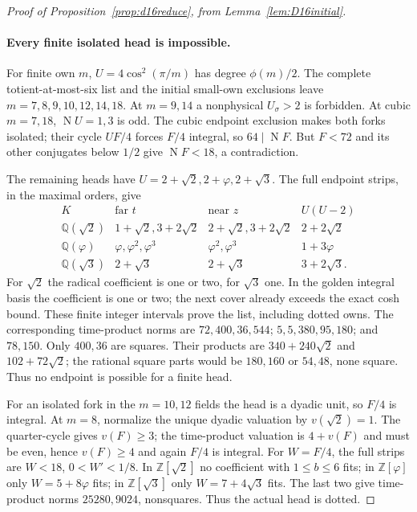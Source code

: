 \documentclass[11pt]{article}
\newcommand{\N}{\operatorname{N}}
\begin{document}
\begin{proof}[Proof of Proposition~\ref{prop:d16reduce}, from
Lemma~\ref{lem:D16initial}]
\paragraph{Every finite isolated head is impossible.}
For finite own $m$, $U=4\cos^2(\pi/m)$ has degree $\phi(m)/2$.
The complete totient-at-most-six list and the initial small-own
exclusions leave $m=7,8,9,10,12,14,18$.
At $m=9,14$ a nonphysical $U_\sigma>2$ is forbidden.
At cubic $m=7,18$, $\N U=1,3$ is odd. The cubic endpoint
exclusion makes both forks isolated; their cycle $UF/4$ forces
$F/4$ integral, so $64\mid\N F$. But $F<72$ and its other
conjugates below $1/2$ give $\N F<18$, a contradiction.

The remaining heads have $U=2+\sqrt2,2+\varphi,2+\sqrt3$.
The full endpoint strips, in the maximal orders, give
\[
\begin{array}{c|c|c|c}
K&\text{far }t&\text{near }z&U(U-2)\\\hline
\mathbb Q(\sqrt2)&1+\sqrt2,3+2\sqrt2&2+\sqrt2,3+2\sqrt2&2+2\sqrt2\\
\mathbb Q(\varphi)&\varphi,\varphi^2,\varphi^3&\varphi^2,\varphi^3&1+3\varphi\\
\mathbb Q(\sqrt3)&2+\sqrt3&2+\sqrt3&3+2\sqrt3.
\end{array}
\]
For $\sqrt2$ the radical coefficient is one or two, for $\sqrt3$
one. In the golden integral basis the coefficient is one or two;
the next cover already exceeds the exact cosh bound. These finite
integer intervals prove the list, including dotted owns.
The corresponding time-product norms are $72,400,36,544$;
$5,5,380,95,180$; and $78,150$. Only $400,36$ are squares.
Their products are $340+240\sqrt2$ and $102+72\sqrt2$;
the rational square parts would be $180,160$ or $54,48$, none square.
Thus no endpoint is possible for a finite head.

For an isolated fork in the $m=10,12$ fields the head is a dyadic
unit, so $F/4$ is integral. At $m=8$, normalize the unique dyadic
valuation by $v(\sqrt2)=1$. The quarter-cycle gives $v(F)\ge3$;
the time-product valuation is $4+v(F)$ and must be even, hence
$v(F)\ge4$ and again $F/4$ is integral.
For $W=F/4$, the full strips are $W<18$, $0<W'<1/8$.
In $\mathbb Z[\sqrt2]$ no coefficient with $1\le b\le6$ fits;
in $\mathbb Z[\varphi]$ only $W=5+8\varphi$ fits;
in $\mathbb Z[\sqrt3]$ only $W=7+4\sqrt3$ fits.
The last two give time-product norms $25280,9024$, nonsquares.
Thus the actual head is dotted.


\end{proof}
\end{document}
